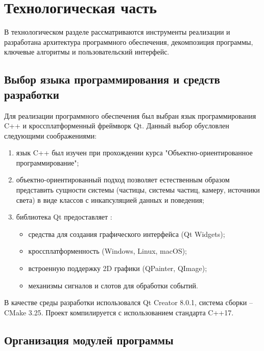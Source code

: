 \chapter{Технологическая часть}

В технологическом разделе рассматриваются инструменты реализации и разработана архитектура программного обеспечения, декомпозиция программы, ключевые алгоритмы и пользовательский интерфейс.

\section{Выбор языка программирования и средств разработки}

Для реализации программного обеспечения был выбран язык программирования C++ и кроссплатформенный фреймворк Qt. Данный выбор обусловлен следующими соображениями:

\begin{enumerate}
	\item язык C++ был изучен при прохождении курса "Объектно-ориентированное программирование";
	
	\item объектно-ориентированный подход позволяет естественным образом представить сущности системы (частицы, системы частиц, камеру, источники света) в виде классов с инкапсуляцией данных и поведения;
	
	\item библиотека Qt предоставляет \cite{QtDocs}:
	\begin{itemize}
		\item средства для создания графического интерфейса (Qt Widgets);
		\item кроссплатформенность (Windows, Linux, macOS);
		\item встроенную поддержку 2D графики (QPainter, QImage);
		\item механизмы сигналов и слотов для обработки событий.
	\end{itemize}
\end{enumerate}

В качестве среды разработки использовался Qt Creator 8.0.1, система сборки -- CMake 3.25. Проект компилируется с использованием стандарта C++17.

\clearpage

\section{Организация модулей программы}

